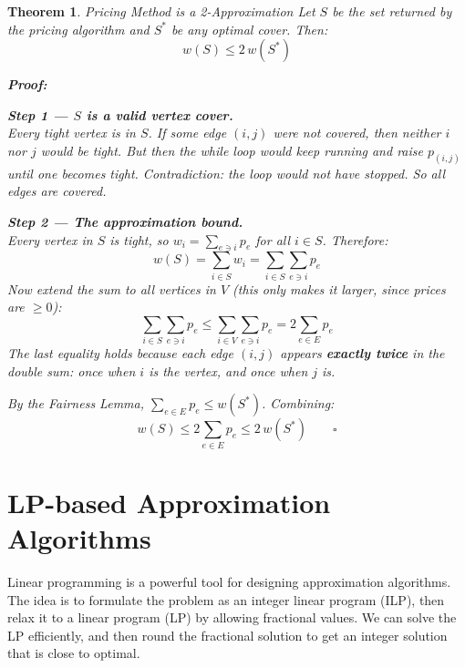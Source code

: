 \documentclass[12pt,a4paper]{report}
\newtheorem{theorem}{Theorem}
\begin{document}
\begin{theorem}{Pricing Method is a 2-Approximation}{}
Let $S$ be the set returned by the pricing algorithm and $S^*$ be any optimal cover. Then:
\[
w(S) \leq 2\,w(S^*)
\]

\textbf{Proof:}

\textbf{Step 1 --- $S$ is a valid vertex cover.}\\
Every tight vertex is in $S$. If some edge $(i,j)$ were not covered, then neither $i$ nor $j$ would be tight. But then the while loop would keep running and raise $p_{(i,j)}$ until one becomes tight. Contradiction: the loop would not have stopped. So all edges are covered.

\textbf{Step 2 --- The approximation bound.}\\
Every vertex in $S$ is tight, so $w_i = \sum_{e \ni i} p_e$ for all $i \in S$. Therefore:
\[
w(S) = \sum_{i \in S} w_i = \sum_{i \in S} \sum_{e \ni i} p_e
\]
Now extend the sum to all vertices in $V$ (this only makes it larger, since prices are $\geq 0$):
\[
\sum_{i \in S} \sum_{e \ni i} p_e \leq \sum_{i \in V} \sum_{e \ni i} p_e = 2\sum_{e \in E} p_e
\]
The last equality holds because each edge $(i,j)$ appears \textbf{exactly twice} in the double sum: once when $i$ is the vertex, and once when $j$ is.

By the Fairness Lemma, $\sum_{e \in E} p_e \leq w(S^*)$. Combining:
\[
w(S) \leq 2\sum_{e \in E} p_e \leq 2\,w(S^*) \qquad \square
\]
\end{theorem}


\section{LP-based Approximation Algorithms}
Linear programming is a powerful tool for designing approximation algorithms. The idea is to formulate the problem as an integer linear program (ILP), then relax it to a linear program (LP) by allowing fractional values. We can solve the LP efficiently, and then round the fractional solution to get an integer solution that is close to optimal.
\end{document}
